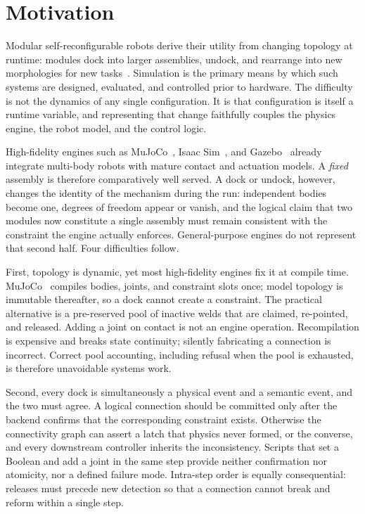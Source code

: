 
\section{Motivation}

Modular self-reconfigurable robots derive their utility from changing topology
at runtime: modules dock into larger assemblies, undock, and rearrange into new
morphologies for new tasks~\cite{yim2007modular,thalamy2019survey}. Simulation is
the primary means by which such systems are designed, evaluated, and controlled
prior to hardware. The difficulty is not the dynamics of any single
configuration. It is that configuration is itself a runtime variable, and
representing that change faithfully couples the physics engine, the robot model,
and the control logic.

High-fidelity engines such as MuJoCo~\cite{todorov2012mujoco}, Isaac
Sim~\cite{nvidia_isaacsim}, and Gazebo~\cite{koenig2004gazebo} already integrate
multi-body robots with mature contact and actuation models. A \emph{fixed}
assembly is therefore comparatively well served. A dock or undock, however,
changes the identity of the mechanism during the run: independent bodies become
one, degrees of freedom appear or vanish, and the logical claim that two modules
now constitute a single assembly must remain consistent with the constraint the
engine actually enforces. General-purpose engines do not represent that second
half. Four difficulties follow.

First, topology is dynamic, yet most high-fidelity engines fix it at compile
time. MuJoCo~\cite{todorov2012mujoco} compiles bodies, joints, and constraint
slots once; model topology is immutable thereafter, so a dock cannot create a
constraint. The practical alternative is a pre-reserved pool of inactive welds
that are claimed, re-pointed, and released. Adding a joint on contact is not an
engine operation. Recompilation is expensive and breaks state continuity;
silently fabricating a connection is incorrect. Correct pool accounting,
including refusal when the pool is exhausted, is therefore unavoidable systems
work.

Second, every dock is simultaneously a physical event and a semantic event, and
the two must agree. A logical connection should be committed only after the
backend confirms that the corresponding constraint exists. Otherwise the
connectivity graph can assert a latch that physics never formed, or the converse,
and every downstream controller inherits the inconsistency. Scripts that set a
Boolean and add a joint in the same step provide neither confirmation nor
atomicity, nor a defined failure mode. Intra-step order is equally consequential:
releases must precede new detection so that a connection cannot break and reform
within a single step.

